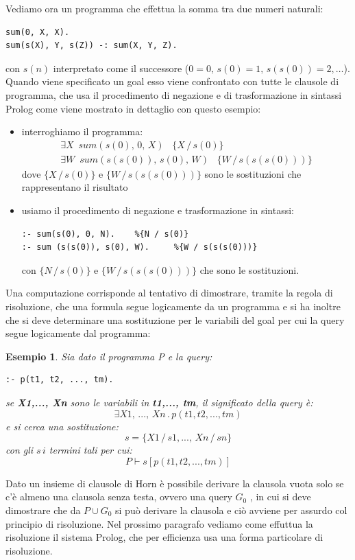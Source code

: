 \documentclass[a4paper]{book}
\newtheorem*{esempio}{Esempio}
\begin{document}
Vediamo ora un programma che effettua la somma tra due numeri naturali:
\begin{verbatim}
sum(0, X, X).
sum(s(X), Y, s(Z)) -: sum(X, Y, Z).
\end{verbatim}
con $s(n)$ interpretato come il successore ($0=0,\, s(0)=1, \,s(s(0))=2,\dots $).\newline
Quando viene specificato un goal esso viene confrontato con tutte le clausole di programma, che usa il procedimento di negazione
e di trasformazione in sintassi Prolog come viene mostrato in dettaglio con questo esempio:
\begin{itemize}
\item  interroghiamo il programma:
  \begin{equation*}
  \begin{split}
    \exists X\,\,\, sum(s(0),\, 0,\, X)\,\,\,\,\,\{X\,/\, s(0)\} \\
    \exists W\,\,\, sum(s(s(0)),\, s(0), \, W)\,\,\,\,\,\{W\,/\, s(s(s(0)))\}
  \end{split}
  \end{equation*}
dove $\{X\,/\, s(0)\}$ e $\{W\,/\, s(s(s(0)))\}$ sono le sostituzioni che rappresentano il risultato
\item usiamo il procedimento di negazione e trasformazione in sintassi:
\begin{verbatim}
:- sum(s(0), 0, N).    %{N / s(0)}
:- sum (s(s(0)), s(0), W).     %{W / s(s(s(0)))}
\end{verbatim}
con $\{N\, /\, s(0)\}$ e $\{W \,/\, s(s(s(0)))\}$ che sono le sostituzioni.
\end{itemize}
Una computazione corrisponde al tentativo di dimostrare, tramite la regola di risoluzione, che una formula segue logicamente da un programma
e si ha inoltre che si deve determinare una sostituzione per le variabili del goal per cui la query segue  logicamente dal programma:
\begin{esempio}
Sia dato il programma P e la query:
\begin{verbatim}
:- p(t1, t2, ..., tm).
\end{verbatim}
se \textbf{X1,..., Xn} sono le variabili in \textbf{t1,..., tm}, il significato della query è:
\begin{equation*}
  \exists X1,\,..., \,Xn\, . \,p(t1, t2, ..., tm)
\end{equation*}
e si cerca una sostituzione:
\begin{equation*}
  s=\{X1\,/\,s1,...,\, Xn\,/\,sn\}
\end{equation*}
con gli $s\,i$ termini tali per cui:
\begin{equation*}
  P\vdash s[p(t1, t2, ..., tm)]
\end{equation*}
\end{esempio}
Dato un insieme di clausole di Horn è possibile derivare la clausola vuota solo se c'è almeno una clausola senza testa, ovvero una query $G_0$
, in cui si deve dimostrare che da $P \cup G_0$ si può derivare la clausola e ciò avviene per assurdo col principio di risoluzione.\newline
Nel prossimo paragrafo vediamo come effuttua la risoluzione il sistema Prolog, che per efficienza usa una forma particolare di risoluzione.
\end{document}

